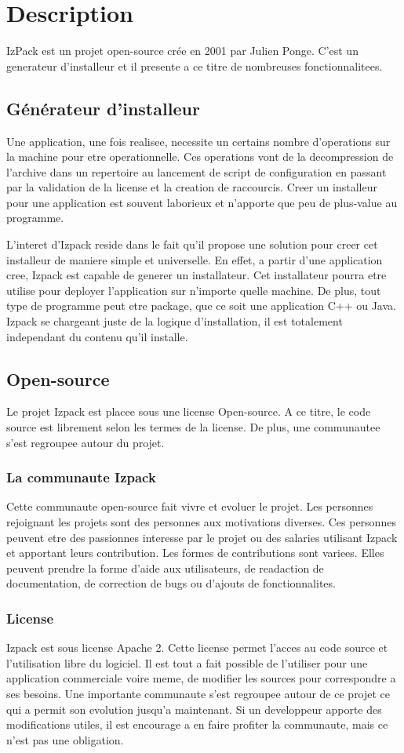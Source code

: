 \section{Description}
IzPack est un projet open-source crée en 2001 par Julien Ponge. C'est un generateur d'installeur et il presente a ce titre de nombreuses fonctionnalitees.
\subsection{Générateur d'installeur}
Une application, une fois realisee, necessite un certains nombre d'operations sur la machine pour etre operationnelle. Ces operations vont de la decompression de l'archive dans un repertoire au lancement de script de configuration en passant par la validation de la license et la creation de raccourcis. Creer un installeur pour une application est souvent laborieux et n'apporte que peu de plus-value au programme. 

L'interet d'Izpack reside dans le fait qu'il propose une solution pour creer cet installeur de maniere simple et universelle. En effet, a partir d'une application cree, Izpack est capable de generer un installateur. Cet installateur pourra etre utilise pour deployer l'application sur n'importe quelle machine. De plus, tout type de programme peut etre package, que ce soit une application C++ ou Java. Izpack se chargeant juste de la logique d'installation, il est totalement independant du contenu qu'il installe.
\subsection{Open-source}
Le projet Izpack est placee sous une license Open-source. A ce titre, le code source est librement selon les termes de la license. De plus, une communautee s'est regroupee autour du projet.
\subsubsection{La communaute Izpack}
Cette communaute open-source fait vivre et evoluer le projet. Les personnes rejoignant les projets sont des personnes aux motivations diverses. Ces personnes peuvent etre des passionnes interesse par le projet ou des salaries utilisant Izpack et apportant leurs contribution. Les formes de contributions sont variees. Elles peuvent prendre la forme d'aide aux utilisateurs, de readaction de documentation, de correction de bugs ou d'ajouts de fonctionnalites.
\subsubsection{License}
Izpack est sous license Apache 2. Cette license permet l'acces au code source et l'utilisation libre du logiciel. Il est tout a fait possible de l'utiliser pour une application commerciale voire meme, de modifier les sources pour correspondre a ses besoins. Une importante communaute s'est regroupee autour de ce projet ce qui a permit son evolution jusqu'a maintenant. Si un developpeur apporte des modifications utiles, il est encourage a en faire profiter la communaute, mais ce n'est pas une obligation.
